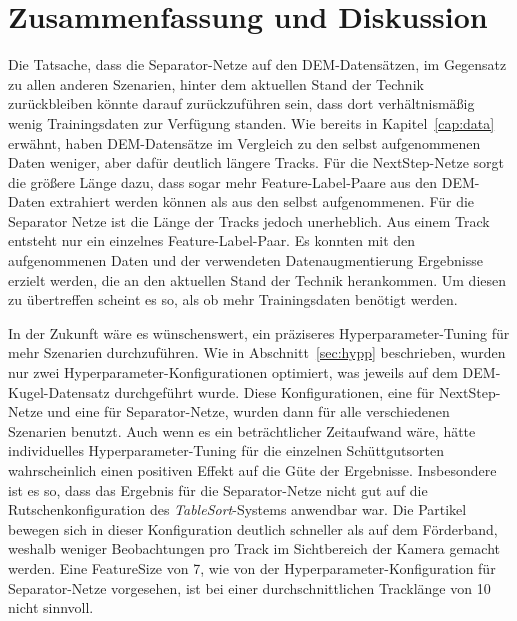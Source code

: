 \section{Zusammenfassung und Diskussion}


Die Tatsache, dass die Separator-Netze auf den DEM-Datensätzen, im Gegensatz zu allen anderen Szenarien,
hinter dem aktuellen Stand der Technik zurückbleiben könnte darauf zurückzuführen sein, 
dass dort verhältnismäßig wenig Trainingsdaten zur Verfügung standen.
Wie bereits in Kapitel~\ref{cap:data} erwähnt, haben DEM-Datensätze im Vergleich zu den selbst aufgenommenen Daten weniger, aber dafür deutlich längere Tracks.
Für die NextStep-Netze sorgt die größere Länge dazu, dass sogar mehr Feature-Label-Paare aus den DEM-Daten extrahiert werden können als aus den selbst aufgenommenen.
Für die Separator Netze ist die Länge der Tracks jedoch unerheblich.
Aus einem Track entsteht nur ein einzelnes Feature-Label-Paar.
Es konnten mit den aufgenommenen Daten und der verwendeten Datenaugmentierung Ergebnisse erzielt werden, die an den aktuellen Stand der Technik herankommen.
Um diesen zu übertreffen scheint es so, als ob mehr Trainingsdaten benötigt werden.


In der Zukunft wäre es wünschenswert, ein präziseres Hyperparameter-Tuning für mehr Szenarien durchzuführen.
Wie in Abschnitt~\ref{sec:hypp} beschrieben, wurden nur zwei Hyperparameter-Konfigurationen optimiert, was jeweils auf dem DEM-Kugel-Datensatz durchgeführt wurde.
Diese Konfigurationen, eine für NextStep-Netze und eine für Separator-Netze, wurden dann für alle verschiedenen Szenarien benutzt.
Auch wenn es ein beträchtlicher Zeitaufwand wäre, hätte individuelles Hyperparameter-Tuning für die einzelnen Schüttgutsorten wahrscheinlich einen positiven Effekt auf die Güte der Ergebnisse.
Insbesondere ist es so, dass das Ergebnis für die Separator-Netze nicht gut auf die Rutschenkonfiguration des \textit{TableSort}-Systems anwendbar war.
Die Partikel bewegen sich in dieser Konfiguration deutlich schneller als auf dem Förderband, weshalb weniger Beobachtungen pro Track im Sichtbereich der Kamera gemacht werden.
Eine FeatureSize von 7, wie von der Hyperparameter-Konfiguration für Separator-Netze vorgesehen, ist bei einer durchschnittlichen Tracklänge von 10 nicht sinnvoll.



